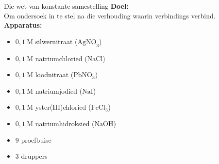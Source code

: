 \begin{Investigation}{Die wet van konstante samestelling}
 \textbf{Doel:} \\
Om ondersoek in te stel na die verhouding waarin verbindings verbind. \\
\textbf{Apparatus:} \\
\begin{minipage}{.4\textwidth}
\begin{itemize}[noitemsep]
\item $0,1~\text{M}$ silwernitraat ($\text{AgNO}_3$)
\item $0,1~\text{M}$ natriumchloried ($\text{NaCl}$)
\item $0,1~\text{M}$ loodnitraat ($\text{PbNO}_{3}$)
\item $0,1~\text{M}$ natriumjodied ($\text{NaI}$)
\item $0,1~\text{M}$ yster(III)chloried ($\text{FeCl}_{3}$)
\item $0,1~\text{M}$ natriumhidroksied ($\text{NaOH}$)
\item 9 proefbuise
\item 3 druppers
\end{itemize}
\end{minipage} 
\begin{minipage}{.6\textwidth}
 \begin{center}
 \end{center}
\end{minipage}

\end{Investigation}

